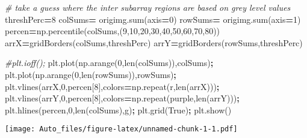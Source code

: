 \documentclass[
]{article}
\newenvironment{Shaded}{\begin{snugshade}}{\end{snugshade}}
\newcommand{\BuiltInTok}[1]{#1}
\newcommand{\CommentTok}[1]{\textcolor[rgb]{0.56,0.35,0.01}{\textit{#1}}}
\newcommand{\DecValTok}[1]{\textcolor[rgb]{0.00,0.00,0.81}{#1}}
\newcommand{\NormalTok}[1]{#1}
\newcommand{\OperatorTok}[1]{\textcolor[rgb]{0.81,0.36,0.00}{\textbf{#1}}}
\newcommand{\StringTok}[1]{\textcolor[rgb]{0.31,0.60,0.02}{#1}}
\newcommand{\VariableTok}[1]{\textcolor[rgb]{0.00,0.00,0.00}{#1}}
\begin{document}
\begin{Shaded}
\begin{Highlighting}[]

\CommentTok{\# take a guess where the inter subarray regions are based on grey level values}
\NormalTok{threshPerc}\OperatorTok{=}\DecValTok{8}
\NormalTok{colSums}\OperatorTok{=}\NormalTok{ origimg.}\BuiltInTok{sum}\NormalTok{(axis}\OperatorTok{=}\DecValTok{0}\NormalTok{)}
\NormalTok{rowSums}\OperatorTok{=}\NormalTok{ origimg.}\BuiltInTok{sum}\NormalTok{(axis}\OperatorTok{=}\DecValTok{1}\NormalTok{)}
\NormalTok{percen}\OperatorTok{=}\NormalTok{np.percentile(colSums,(}\DecValTok{9}\NormalTok{,}\DecValTok{10}\NormalTok{,}\DecValTok{20}\NormalTok{,}\DecValTok{30}\NormalTok{,}\DecValTok{40}\NormalTok{,}\DecValTok{50}\NormalTok{,}\DecValTok{60}\NormalTok{,}\DecValTok{70}\NormalTok{,}\DecValTok{80}\NormalTok{))}
\NormalTok{arrX}\OperatorTok{=}\NormalTok{gridBorders(colSums,threshPerc)}
\NormalTok{arrY}\OperatorTok{=}\NormalTok{gridBorders(rowSums,threshPerc)}


\CommentTok{\#plt.ioff();}
\NormalTok{plt.plot(np.arange(}\DecValTok{0}\NormalTok{,}\BuiltInTok{len}\NormalTok{(colSums)),colSums)}\OperatorTok{;}
\NormalTok{plt.plot(np.arange(}\DecValTok{0}\NormalTok{,}\BuiltInTok{len}\NormalTok{(rowSums)),rowSums)}\OperatorTok{;}
\NormalTok{plt.vlines(arrX,}\DecValTok{0}\NormalTok{,percen[}\DecValTok{8}\NormalTok{],colors}\OperatorTok{=}\NormalTok{np.repeat(}\StringTok{\textquotesingle{}r\textquotesingle{}}\NormalTok{,}\BuiltInTok{len}\NormalTok{(arrX)))}\OperatorTok{;}
\NormalTok{plt.vlines(arrY,}\DecValTok{0}\NormalTok{,percen[}\DecValTok{8}\NormalTok{],colors}\OperatorTok{=}\NormalTok{np.repeat(}\StringTok{\textquotesingle{}purple\textquotesingle{}}\NormalTok{,}\BuiltInTok{len}\NormalTok{(arrY)))}\OperatorTok{;}
\NormalTok{plt.hlines(percen,}\DecValTok{0}\NormalTok{,}\BuiltInTok{len}\NormalTok{(colSums),}\StringTok{\textquotesingle{}g\textquotesingle{}}\NormalTok{)}\OperatorTok{;}
\NormalTok{plt.grid(}\VariableTok{True}\NormalTok{)}\OperatorTok{;}
\NormalTok{plt.show()}
\end{Highlighting}
\end{Shaded}

\texttt{[image: Auto\_files/figure-latex/unnamed-chunk-1-1.pdf]}
\end{document}
